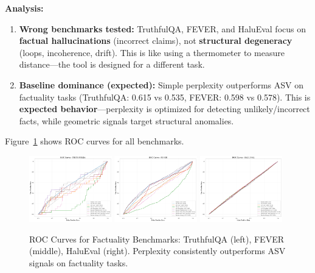 \documentclass[10pt]{article}
\begin{document}
\textbf{Analysis:}
\begin{enumerate}
\item \textbf{Wrong benchmarks tested:} TruthfulQA, FEVER, and HaluEval focus on \textbf{factual hallucinations} (incorrect claims), not \textbf{structural degeneracy} (loops, incoherence, drift). This is like using a thermometer to measure distance---the tool is designed for a different task.
\item \textbf{Baseline dominance (expected):} Simple perplexity outperforms ASV on factuality tasks (TruthfulQA: 0.615 vs 0.535, FEVER: 0.598 vs 0.578). This is \textbf{expected behavior}---perplexity is optimized for detecting unlikely/incorrect facts, while geometric signals target structural anomalies.
\end{enumerate}

Figure~\ref{fig:factuality-roc} shows ROC curves for all benchmarks.

\begin{figure}[h]
\centering
\includegraphics[width=0.32\textwidth]{../../figures/truthfulqa_roc_curves.png}
\includegraphics[width=0.32\textwidth]{../../figures/fever_roc_curves.png}
\includegraphics[width=0.32\textwidth]{../../figures/halueval_roc_curves.png}
\caption{ROC Curves for Factuality Benchmarks: TruthfulQA (left), FEVER (middle), HaluEval (right). Perplexity consistently outperforms ASV signals on factuality tasks.}
\label{fig:factuality-roc}
\end{figure}
\end{document}
